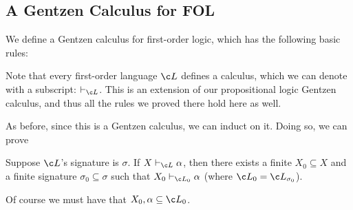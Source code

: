 \subsection{A Gentzen Calculus for FOL}

We define a Gentzen calculus for first-order logic, which has the following basic rules:

\centerline{\vbox{\jot
{}}}

Note that every first-order language $\c L$ defines a calculus, which we can denote with a subscript: $\vdash_{\c L}$.
This is an extension of our propositional logic Gentzen calculus, and thus all the rules we proved there hold here as well.

As before, since this is a Gentzen calculus, we can induct on it.
Doing so, we can prove

\bprop

    Suppose $\c L$'s signature is $\sigma$.
    If $X\vdash_{\c L}\alpha$, then there exists a finite $X_0\subseteq X$ and a finite signature $\sigma_0\subseteq\sigma$ such that $X_0\vdash_{\c L_0}\alpha$ (where $\c L_0=\c L_{\sigma_0}$).

\eprop

Of course we must have that $X_0,\alpha\subseteq\c L_0$.

